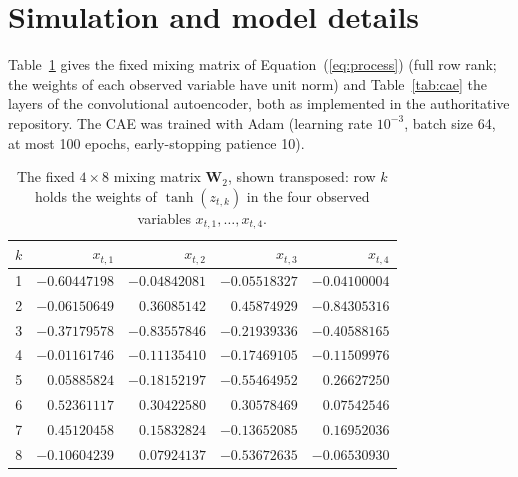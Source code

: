 \section{Simulation and model details}
\label{app:model}

Table~\ref{tab:w2} gives the fixed mixing matrix of Equation~(\ref{eq:process}) (full row rank; the
weights of each observed variable have unit norm) and Table~\ref{tab:cae} the layers of the convolutional autoencoder, both as implemented in the authoritative repository. The CAE was trained with Adam (learning rate $10^{-3}$, batch size 64, at most 100 epochs, early-stopping patience 10).

\begin{table}[!ht]
\centering
\caption[The fixed mixing matrix]{The fixed $4\times8$ mixing matrix $\bm{W}_2$, shown transposed: row $k$
holds the weights of $\tanh(z_{t,k})$ in the four observed variables $x_{t,1},\dots,x_{t,4}$.}
\label{tab:w2}
\begin{tabular}{crrrr}
\toprule
$k$ & $x_{t,1}$ & $x_{t,2}$ & $x_{t,3}$ & $x_{t,4}$ \\
\midrule
1 & $-0.60447198$ & $-0.04842081$ & $-0.05518327$ & $-0.04100004$ \\
2 & $-0.06150649$ & $0.36085142$ & $0.45874929$ & $-0.84305316$ \\
3 & $-0.37179578$ & $-0.83557846$ & $-0.21939336$ & $-0.40588165$ \\
4 & $-0.01161746$ & $-0.11135410$ & $-0.17469105$ & $-0.11509976$ \\
5 & $0.05885824$ & $-0.18152197$ & $-0.55464952$ & $0.26627250$ \\
6 & $0.52361117$ & $0.30422580$ & $0.30578469$ & $0.07542546$ \\
7 & $0.45120458$ & $0.15832824$ & $-0.13652085$ & $0.16952036$ \\
8 & $-0.10604239$ & $0.07924137$ & $-0.53672635$ & $-0.06530930$ \\
\bottomrule
\end{tabular}
\end{table}


